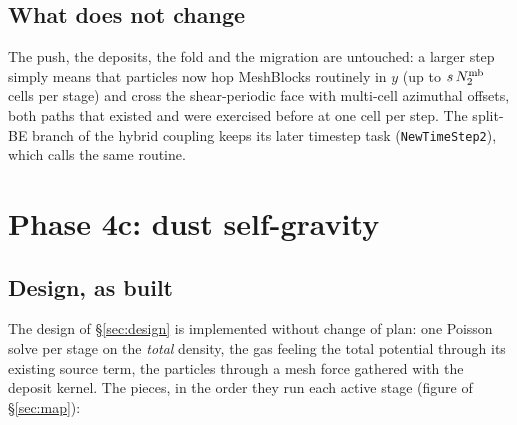 \documentclass[11pt]{article}
\newcommand{\fn}[1]{\texttt{\small #1}}
\begin{document}
\subsection{What does not change}

The push, the deposits, the fold and the migration are untouched: a larger step simply
means that particles now hop MeshBlocks routinely in $y$ (up to $s\,N_2^{\rm mb}$ cells
per stage) and cross the shear-periodic face with multi-cell azimuthal offsets, both
paths that existed and were exercised before at one cell per step. The split-BE branch
of the hybrid coupling keeps its later timestep task (\fn{NewTimeStep2}), which calls
the same routine.

\section{Phase 4c: dust self-gravity}
\label{sec:phase4c}

\subsection{Design, as built}

The design of \S\ref{sec:design} is implemented without change of plan: one Poisson
solve per stage on the \emph{total} density, the gas feeling the total potential through
its existing source term, the particles through a mesh force gathered with the deposit
kernel. The pieces, in the order they run each active stage (figure of \S\ref{sec:map}):
\end{document}
